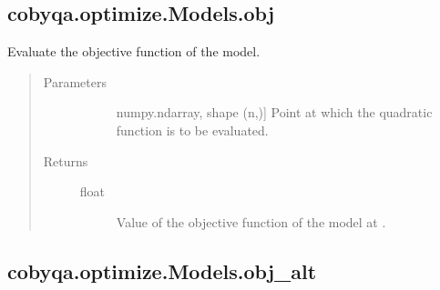 \documentclass[letterpaper,10pt,english]{sphinxmanual}
\begin{document}
\begin{fulllineitems}
\begin{fulllineitems}
\begin{quote}
\begin{description}
\begin{description}
\end{description}

\end{description}\end{quote}

\end{fulllineitems}



\subsection{cobyqa.optimize.Models.obj}
\label{\detokenize{refs/generated/cobyqa.optimize.Models.obj:cobyqa-optimize-models-obj}}\label{\detokenize{refs/generated/cobyqa.optimize.Models.obj::doc}}

\begin{fulllineitems}
\label{\detokenize{refs/generated/cobyqa.optimize.Models.obj:cobyqa.optimize.Models.obj}}
\sphinxAtStartPar
Evaluate the objective function of the model.
\begin{quote}\begin{description}
\item[{Parameters}] \leavevmode\begin{description}
\item[{}] \leavevmode{[}numpy.ndarray, shape (n,){]}
\sphinxAtStartPar
Point at which the quadratic function is to be evaluated.

\end{description}

\item[{Returns}] \leavevmode\begin{description}
\item[{float}] \leavevmode
\sphinxAtStartPar
Value of the objective function of the model at .

\end{description}

\end{description}\end{quote}

\end{fulllineitems}



\subsection{cobyqa.optimize.Models.obj\_alt}
\label{\detokenize{refs/generated/cobyqa.optimize.Models.obj_alt:cobyqa-optimize-models-obj-alt}}\label{\detokenize{refs/generated/cobyqa.optimize.Models.obj_alt::doc}}


\end{fulllineitems}
\end{document}
